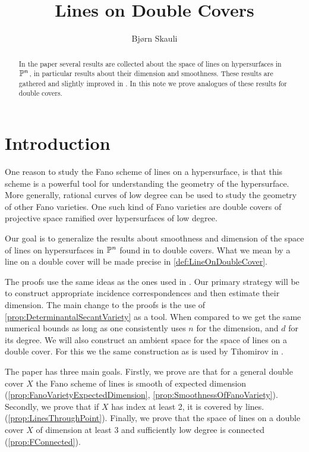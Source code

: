 \title{Lines on Double Covers}
\author{Bjørn Skauli}
\date{}

\maketitle
\label{pap:linesondoublecovers}
\begin{abstract}
In the paper \cite{BarthVandeVenFano} several results are collected about the space of lines on hypersurfaces in $\P^n$, in particular results about their dimension and smoothness. These results are gathered and slightly improved in  \cite[Section V.4]{KollarRationalCurves}. In this note we prove analogues of these results for double covers.
\end{abstract}

\section{Introduction}

One reason to study the Fano scheme of lines on a hypersurface, is that this scheme is a powerful tool for understanding the geometry of the hypersurface. More generally, rational curves of low degree can be used to study the geometry of other Fano varieties. One such kind of Fano varieties are double covers of projective space ramified over hypersurfaces of low degree.

Our goal is to generalize the results about smoothness and dimension of the space of lines on hypersurfaces in $\P^n$ found in \cite[Section V.4]{KollarRationalCurves} to double covers. What we mean by a line on a double cover will be made precise in \cref{def:LineOnDoubleCover}.

The proofs use the same ideas as the ones used in \cite[Section V.4]{KollarRationalCurves}. Our primary strategy will be to construct appropriate incidence correspondences and then estimate their dimension. The main change to the proofs is the use of \cref{prop:DeterminantalSecantVariety} as a tool. When compared to \cite[Theorem V.4.3]{KollarRationalCurves} we get the same numerical bounds as long as one consistently uses $n$ for the dimension, and $d$ for its degree.  We will also construct an ambient space for the space of lines on a double cover. For this we the same construction as is used by Tihomirov in \cite{TihFanoSurface}.

The paper has three main goals. Firstly, we prove are that for a general double cover $X$ the Fano scheme of lines is smooth of expected dimension (\cref{prop:FanoVarietyExpectedDimension}, \cref{prop:SmoothnessOfFanoVariety}). Secondly, we prove that if $X$ has index at least 2, it is covered by lines. (\cref{prop:LinesThroughPoint}). Finally, we prove that the space of lines on a double cover $X$ of dimension at least 3 and sufficiently low degree is connected (\cref{prop:FConnected}).


